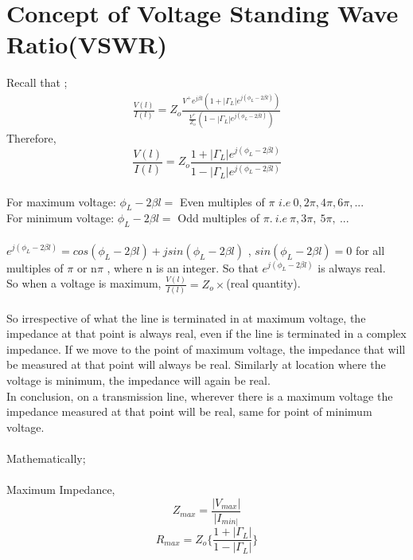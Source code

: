 	\section{Concept of Voltage Standing Wave Ratio(VSWR)}
	Recall that ;
	\begin{align*}
	\frac{V(l)}{I(l)} = Z_o \frac{V^{+}e^{j\beta l}(1+ |\Gamma_L|e^{j(\phi_L- 2 \beta l)})}{\frac{V^{+}}{Z_o}(1- |\Gamma_L|e^{j(\phi_L- 2\beta l)})}
	\end{align*}
	Therefore,
	\begin{equation*}
	\frac{V(l)}{I(l)} = Z_o \frac{1+ |\Gamma_L|e^{j(\phi_L- 2 \beta l)}}{1- |\Gamma_L|e^{j(\phi_L- 2\beta l)}}
	\end{equation*}\\
	For maximum voltage: $\phi_L-2\beta l=$ Even multiples of $\pi$ $i.e\ 0, 2\pi, 4\pi,  6\pi,...$\\
	 For minimum voltage:  $\phi_L-2\beta l=$ Odd multiples of $\pi. \ i.e\ \pi, 3\pi,\ 5\pi,\ ...$ 
	\\\\$e^{j(\phi_L - 2 \beta l)} = cos(\phi_L - 2 \beta l) + jsin(\phi_L - 2 \beta l)$ , $sin(\phi_L - 2 \beta l) = 0$ for all multiples of $\pi$ or n$\pi$ , where n is an integer. So that $e^{j(\phi_L - 2 \beta l)} $ is always real.
	\\ So when a voltage is maximum, $\frac{V(l)}{I(l)} = Z_o \times$(real quantity).
	\\\\ So irrespective of what the line is terminated in at maximum voltage, the impedance at that point is always real, even if the line is terminated in a complex impedance. If we move to the point of maximum voltage, the impedance that will be measured at that point will always be real. Similarly at location where the voltage is minimum, the impedance will again be real.\\ In conclusion, on a transmission line, wherever there is a maximum  voltage the impedance measured at that point will be real, same for point of minimum voltage.\\ 
	\\Mathematically;	
	\\\\Maximum Impedance, 
	\begin{equation}
	Z_{max} = \frac{|V_{max}|}{|I_{min|}}
	\end{equation}
	\begin{equation}
	R_{max}= Z_o\{\frac{1+|\Gamma_L|}{1-|\Gamma_L|}\}
	\end{equation}\\
